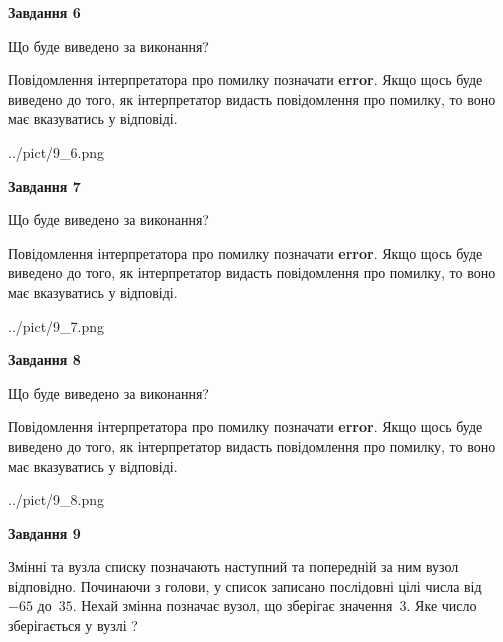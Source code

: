 \documentclass[12pt, ukrainian]{article}
\begin{document}
{\begin {large}
{\begin {center}\textbf{Завдання 6}\end {center}}\par
Що буде виведено за виконання?

Повідомлення інтерпретатора про помилку позначати \textbf{error}.
Якщо щось буде виведено до того, як інтерпретатор видасть повідомлення про помилку, 
то воно має вказуватись у відповіді. \par


\begin{center}
	{../pict/9_6.png}
\end{center}
\newpage

{\begin {center}\textbf{Завдання 7}\end {center}}\par
Що буде виведено за виконання?

Повідомлення інтерпретатора про помилку позначати \textbf{error}.
Якщо щось буде виведено до того, як інтерпретатор видасть повідомлення про помилку, 
то воно має вказуватись у відповіді. \par


\begin{center}
	{../pict/9_7.png}
\end{center}
\newpage

{\begin {center}\textbf{Завдання 8}\end {center}}\par
Що буде виведено за виконання?

Повідомлення інтерпретатора про помилку позначати \textbf{error}.
Якщо щось буде виведено до того, як інтерпретатор видасть повідомлення про помилку, 
то воно має вказуватись у відповіді. \par


\begin{center}
	{../pict/9_8.png}
\end{center}
\newpage

{\begin {center}\textbf{Завдання 9}\end {center}}\par
Змінні  та  вузла списку позначають наступний та попередній за ним вузол відповідно. Починаючи з голови, у список записано послідовні цілі числа від~$-65$ до~$35$. Нехай змінна  позначає вузол, що зберігає значення~$3$.
Яке число зберігається у вузлі  ?\par
\newpage


\end{large}}
\end{document}
